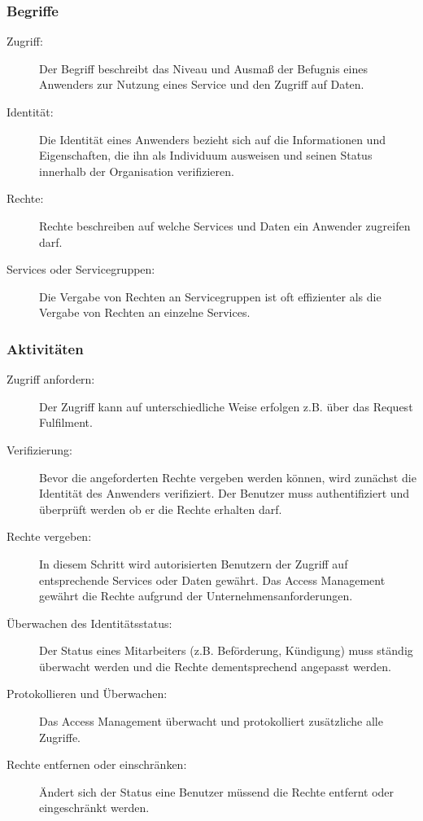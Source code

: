 \subsubsection{Begriffe}

\begin{description}
	\item[Zugriff:] Der Begriff beschreibt das Niveau und Ausmaß der Befugnis eines Anwenders zur Nutzung eines Service und den Zugriff auf Daten.
	\item[Identität:] Die Identität eines Anwenders bezieht sich auf die Informationen und Eigenschaften, die ihn als Individuum ausweisen und seinen Status innerhalb der Organisation verifizieren.
	\item[Rechte:] Rechte beschreiben auf welche Services und Daten ein Anwender zugreifen darf.
	\item[Services oder Servicegruppen:] Die Vergabe von Rechten an Servicegruppen ist oft effizienter als die Vergabe von Rechten an einzelne Services.
\end{description}

\subsubsection{Aktivitäten}

\begin{description}
	\item[Zugriff anfordern:] Der Zugriff kann auf unterschiedliche Weise erfolgen z.B. über das Request Fulfilment.
	\item[Verifizierung:] Bevor die angeforderten Rechte vergeben werden können, wird zunächst die Identität des Anwenders verifiziert. Der Benutzer muss authentifiziert und überprüft werden ob er die Rechte erhalten darf.
	\item[Rechte vergeben:] In diesem Schritt wird autorisierten Benutzern der Zugriff auf entsprechende Services oder Daten gewährt. Das Access Management gewährt die Rechte aufgrund der Unternehmensanforderungen.
	\item[Überwachen des Identitätsstatus:] Der Status eines Mitarbeiters (z.B. Beförderung, Kündigung) muss ständig überwacht werden und die Rechte dementsprechend angepasst werden.
	\item[Protokollieren und Überwachen:] Das Access Management überwacht und protokolliert zusätzliche alle Zugriffe.
	\item[Rechte entfernen oder einschränken:] Ändert sich der Status eine Benutzer müssend die Rechte entfernt oder eingeschränkt werden.
\end{description}

